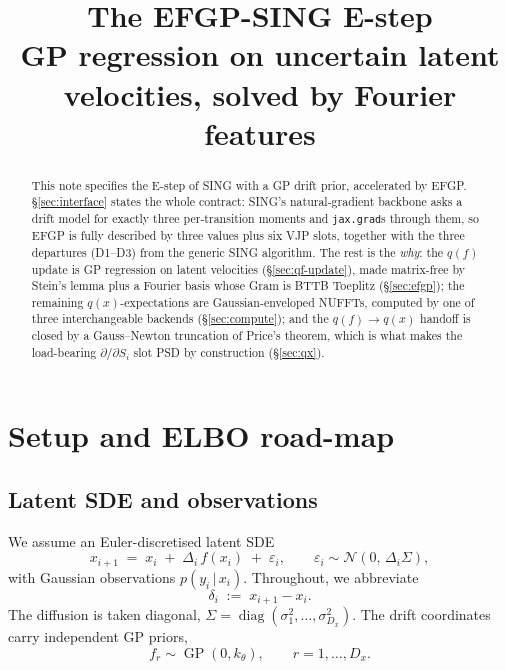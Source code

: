 \documentclass[11pt]{article}
\title{The EFGP-SING E-step\\
\large GP regression on uncertain latent velocities,
solved by Fourier features}
\author{}
\date{}
\newcommand{\diag}{\operatorname{diag}}
\newcommand{\GP}{\operatorname{GP}}
\newcommand{\given}{\,|\,}
\newcommand{\code}[1]{\texttt{\small #1}}
\begin{document}
\maketitle

\begin{abstract}
\noindent
This note specifies the E-step of SING with a GP drift prior,
accelerated by EFGP. \S\ref{sec:interface} states the whole contract:
SING's natural-gradient backbone asks a drift model for exactly three
per-transition moments and \code{jax.grad}s through them, so EFGP is
fully described by three values plus six VJP slots, together with the
three departures (D1--D3) from the generic SING algorithm. The rest is
the \emph{why}: the $q(f)$ update is GP regression on latent velocities
(\S\ref{sec:qf-update}), made matrix-free by Stein's lemma plus a
Fourier basis whose Gram is BTTB Toeplitz (\S\ref{sec:efgp}); the
remaining $q(x)$-expectations are Gaussian-enveloped NUFFTs, computed by
one of three interchangeable backends (\S\ref{sec:compute}); and the
$q(f)\!\to\!q(x)$ handoff is closed by a Gauss--Newton truncation of
Price's theorem, which is what makes the load-bearing $\partial/\partial
S_i$ slot PSD by construction (\S\ref{sec:qx}).
\end{abstract}

\tableofcontents

\section{Setup and ELBO road-map}
\label{sec:setup}

\subsection*{Latent SDE and observations}

We assume an Euler-discretised latent SDE
\begin{equation}
x_{i+1} \;=\; x_i \;+\; \Delta_i\, f(x_i) \;+\; \varepsilon_i,
\qquad \varepsilon_i \sim \mathcal{N}(0,\,\Delta_i\Sigma),
\label{eq:sde}
\end{equation}
with Gaussian observations $p(y_i\given x_i)$. Throughout, we abbreviate
\begin{equation}
\delta_i \;:=\; x_{i+1} - x_i.
\end{equation}
The diffusion is taken diagonal,
$\Sigma=\diag(\sigma_1^2,\ldots,\sigma_{D_x}^2)$. The drift coordinates carry
independent GP priors,
\begin{equation}
f_r \sim \GP(0, k_\theta), \qquad r = 1,\ldots,D_x.
\label{eq:gp-prior}
\end{equation}
\end{document}
